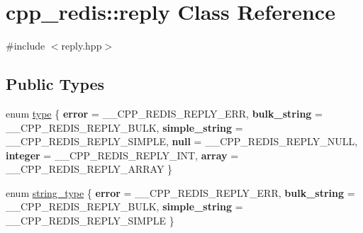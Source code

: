 \hypertarget{classcpp__redis_1_1reply}{}\section{cpp\+\_\+redis\+:\+:reply Class Reference}
\label{classcpp__redis_1_1reply}


{\ttfamily \#include $<$reply.\+hpp$>$}

\subsection*{Public Types}
\begin{DoxyCompactItemize}
\item 
enum \hyperlink{classcpp__redis_1_1reply_acc272b2a52164cac1d110c619a0b25bd}{type} \{ \newline
{\bfseries error} = \+\_\+\+\_\+\+C\+P\+P\+\_\+\+R\+E\+D\+I\+S\+\_\+\+R\+E\+P\+L\+Y\+\_\+\+E\+RR, 
{\bfseries bulk\+\_\+string} = \+\_\+\+\_\+\+C\+P\+P\+\_\+\+R\+E\+D\+I\+S\+\_\+\+R\+E\+P\+L\+Y\+\_\+\+B\+U\+LK, 
{\bfseries simple\+\_\+string} = \+\_\+\+\_\+\+C\+P\+P\+\_\+\+R\+E\+D\+I\+S\+\_\+\+R\+E\+P\+L\+Y\+\_\+\+S\+I\+M\+P\+LE, 
{\bfseries null} = \+\_\+\+\_\+\+C\+P\+P\+\_\+\+R\+E\+D\+I\+S\+\_\+\+R\+E\+P\+L\+Y\+\_\+\+N\+U\+LL, 
\newline
{\bfseries integer} = \+\_\+\+\_\+\+C\+P\+P\+\_\+\+R\+E\+D\+I\+S\+\_\+\+R\+E\+P\+L\+Y\+\_\+\+I\+NT, 
{\bfseries array} = \+\_\+\+\_\+\+C\+P\+P\+\_\+\+R\+E\+D\+I\+S\+\_\+\+R\+E\+P\+L\+Y\+\_\+\+A\+R\+R\+AY
 \}
\item 
enum \hyperlink{classcpp__redis_1_1reply_ac192ba4cb8f2bb6e7cb465edf755328b}{string\+\_\+type} \{ {\bfseries error} = \+\_\+\+\_\+\+C\+P\+P\+\_\+\+R\+E\+D\+I\+S\+\_\+\+R\+E\+P\+L\+Y\+\_\+\+E\+RR, 
{\bfseries bulk\+\_\+string} = \+\_\+\+\_\+\+C\+P\+P\+\_\+\+R\+E\+D\+I\+S\+\_\+\+R\+E\+P\+L\+Y\+\_\+\+B\+U\+LK, 
{\bfseries simple\+\_\+string} = \+\_\+\+\_\+\+C\+P\+P\+\_\+\+R\+E\+D\+I\+S\+\_\+\+R\+E\+P\+L\+Y\+\_\+\+S\+I\+M\+P\+LE
 \}
\end{DoxyCompactItemize}
